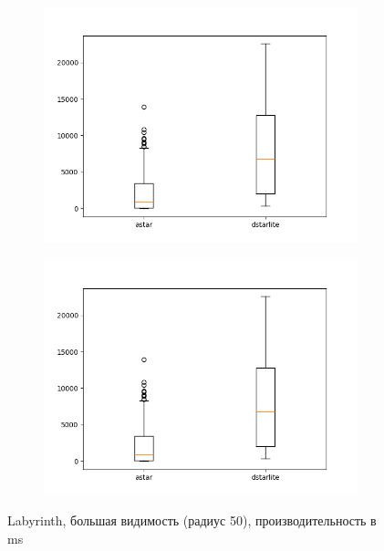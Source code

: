 \documentclass[11pt]{article}
\begin{document}
    \begin{figure}
        \centering
        \begin{subfigure}[b]{0.48\textwidth}
            \centering
            \includegraphics[width=\textwidth]{../plots/r50/Labyrinth-('dynswsffp', 'astar', 'dstarlite').png}
        \end{subfigure}
        \hfill
        \begin{subfigure}[b]{0.48\textwidth}
            \centering
            \includegraphics[width=\textwidth]{../plots/r50/Labyrinth-('astar', 'dstarlite').png}
        \end{subfigure}
        \caption{Labyrinth, большая видимость (радиус 50), производительность в ms}
        \label{fig: Labyrinth-r50}
    \end{figure}
\end{document}
